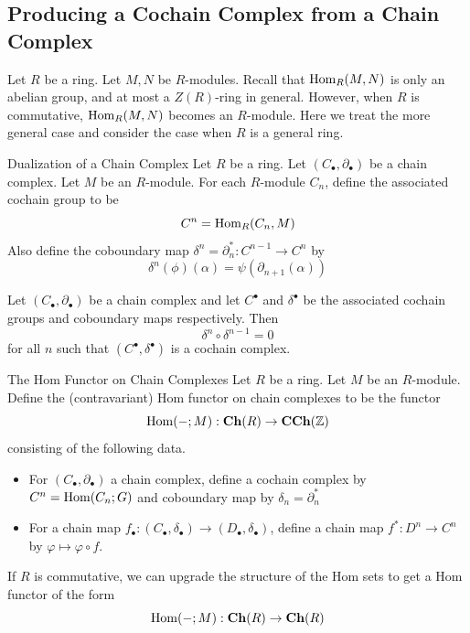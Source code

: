 \documentclass[a4paper]{article}
\begin{document}
\subsection{Producing a Cochain Complex from a Chain Complex}
Let $R$ be a ring. Let $M,N$ be $R$-modules. Recall that $\operatorname{Hom}_R(M,N)$ is only an abelian group, and at most a $Z(R)$-ring in general. However, when $R$ is commutative, $\operatorname{Hom}_R(M,N)$ becomes an $R$-module. Here we treat the more general case and consider the case when $R$ is a general ring. 

\begin{defn}{Dualization of a Chain Complex}{} Let $R$ be a ring. Let $(C_\bullet,\partial_\bullet)$ be a chain complex. Let $M$ be an $R$-module. For each $R$-module $C_n$, define the associated cochain group to be $$C^n=\operatorname{Hom}_R(C_n,M)$$ Also define the coboundary map $\delta^n=\partial_n^\ast:C^{n-1}\to C^n$ by $$\delta^n(\phi)(\alpha)=\psi(\partial_{n+1}(\alpha))$$
\end{defn}

\begin{lmm}{}{} Let $(C_\bullet,\partial_\bullet)$ be a chain complex and let $C^\bullet$ and $\delta^\bullet$ be the associated cochain groups and coboundary maps respectively. Then $$\delta^n\circ\delta^{n-1}=0$$ for all $n$ such that $(C^\bullet,\delta^\bullet)$ is a cochain complex. 
\end{lmm}

\begin{defn}{The Hom Functor on Chain Complexes}{} Let $R$ be a ring. Let $M$ be an $R$-module. Define the (contravariant) Hom functor on chain complexes to be the functor $$\operatorname{Hom}(-;M):\bold{Ch}(R)\to\bold{CCh}(\mathbb{Z})$$ consisting of the following data. 
\begin{itemize}
\item For $(C_\bullet,\partial_\bullet)$ a chain complex, define a cochain complex by $C^n=\operatorname{Hom}(C_n;G)$ and coboundary map by $\delta_n=\partial_n^\ast$
\item For a chain map $f_\bullet:(C_\bullet,\delta_\bullet)\to(D_\bullet,\delta_\bullet)$, define a chain map $f^\ast:D^n\to C^n$ by $\varphi\mapsto\varphi\circ f$. 
\end{itemize}
\end{defn}

If $R$ is commutative, we can upgrade the structure of the Hom sets to get a Hom functor of the form $$\operatorname{Hom}(-;M):\bold{Ch}(R)\to\bold{Ch}(R)$$
\end{document}
